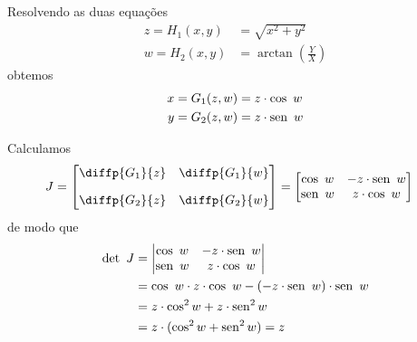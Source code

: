 \begin{example}
\begin{center}
    \end{center}

    Resolvendo as duas equações
    \begin{align*}
        z = H_1(x, y) &= \sqrt{x^2 + y^2} \\
        w = H_2(x, y) &= \arctan\left(\frac{Y}{X}\right)
    \end{align*}
    obtemos
    \begin{align*}
        x = G_1(z, w) &= z \cdot \cos\ w \\
        y = G_2(z, w) &= z \cdot \operatorname{sen}\ w \\
    \end{align*}

    Calculamos
    \begin{align*}
        J &= \begin{bmatrix}
            \diffp{G_1}{z} & \diffp{G_1}{w} \\[10pt]
            \diffp{G_2}{z} & \diffp{G_2}{w} \\
        \end{bmatrix}
        = \begin{bmatrix}
            \cos\ w & -z\cdot\sen\ w \\
            \sen\ w & z\cdot\cos\ w \\
        \end{bmatrix}
    \end{align*}
    de modo que
    \begin{align*}
        \det\ J &= \begin{vmatrix}
            \cos\ w & -z\cdot\operatorname{sen}\ w \\
            \operatorname{sen}\ w & z\cdot\cos\ w \\
        \end{vmatrix} \\
        &= \cos\ w \cdot z\cdot\cos\ w
        - (-z\cdot\operatorname{sen}\ w) \cdot \operatorname{sen}\ w \\
        &= z\cdot \cos^2 w + z\cdot \operatorname{sen}^2 w \\
        &= z\cdot (\cos^2 w + \operatorname{sen}^2 w) = z
    \end{align*}


\end{example}
